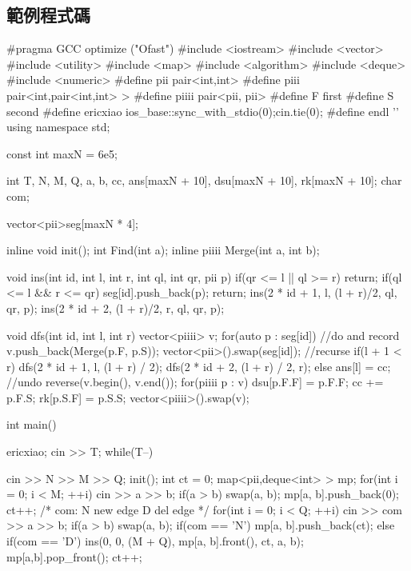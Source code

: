 \documentclass[main.tex]{subfiles}
\begin{document}
\subsection{範例程式碼}
\begin{C++}
#pragma GCC optimize ("Ofast")
#include <iostream>
#include <vector>
#include <utility>
#include <map>
#include <algorithm>
#include <deque>
#include <numeric>
#define pii pair<int,int>
#define piii pair<int,pair<int,int> >
#define piiii pair<pii, pii>
#define F first
#define S second
#define ericxiao ios_base::sync_with_stdio(0);cin.tie(0);
#define endl '\n'
using namespace std;

const int maxN = 6e5;

int T, N, M, Q, a, b, cc, ans[maxN + 10], dsu[maxN + 10], rk[maxN + 10];
char com;

vector<pii>seg[maxN * 4];


inline void init();
int  Find(int a);
inline piiii Merge(int a, int b);

void ins(int id, int l, int r, int ql, int qr, pii p){
    if(qr <= l || ql >= r) return;
    if(ql <= l && r <= qr){
        seg[id].push_back(p);
        return;
    }
    ins(2 * id + 1, l, (l + r)/2, ql, qr, p);
    ins(2 * id + 2, (l + r)/2, r, ql, qr, p);
}


void dfs(int id, int l, int r){
    vector<piiii> v;
    for(auto p : seg[id]){
        //do and record
        v.push_back(Merge(p.F, p.S));
    }
    vector<pii>().swap(seg[id]);
    //recurse
    if(l + 1 < r){
        dfs(2 * id + 1, l, (l + r) / 2);
        dfs(2 * id + 2, (l + r) / 2, r);
    } else {
        ans[l] = cc;
    }
    //undo
    reverse(v.begin(), v.end());
    for(piiii p : v){
        dsu[p.F.F] = p.F.F;
        cc += p.F.S;
        rk[p.S.F] = p.S.S;
    }
    vector<piiii>().swap(v);
}

int main(){
    ericxiao;
    cin >> T;
    while(T--){
        cin >> N >> M >> Q;
        init();
        int ct = 0;
        map<pii,deque<int> > mp;
        for(int i = 0; i < M; ++i){
            cin >> a >> b;
            if(a > b) swap(a, b);
            mp[{a, b}].push_back(0);
            ct++;
        }
        /*
        com:
        N new edge
        D del edge
        */
        for(int i = 0; i < Q; ++i){
            cin >> com >> a >> b;
            if(a > b) swap(a, b);
            if(com == 'N'){
                mp[{a, b}].push_back(ct);
            } else if(com == 'D') {
                ins(0, 0, (M + Q), mp[{a, b}].front(), ct, {a, b});
                mp[{a,b}].pop_front();
            }
            ct++;
        }

}}
\end{C++}
\end{document}
